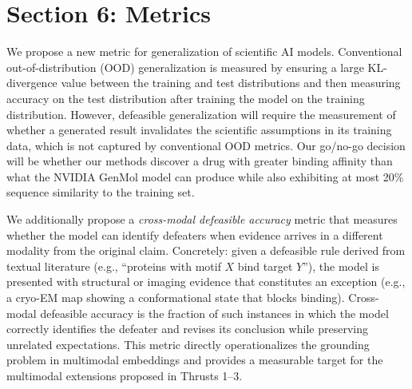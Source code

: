 \documentclass[11pt]{article}
\begin{document}
\section*{Section 6: Metrics}

We propose a new metric for generalization of scientific AI models. Conventional out-of-distribution (OOD) generalization is measured by ensuring a large KL-divergence value between the training and test distributions and then measuring accuracy on the test distribution after training the model on the training distribution. However, defeasible generalization will require the measurement of whether a generated result invalidates the scientific assumptions in its training data, which is not captured by conventional OOD metrics. Our go/no-go decision will be whether our methods discover a drug with greater binding affinity than what the NVIDIA GenMol model can produce while also exhibiting at most 20\% sequence similarity to the training set.

We additionally propose a \emph{cross-modal defeasible accuracy} metric that measures whether the model can identify defeaters when evidence arrives in a different modality from the original claim. Concretely: given a defeasible rule derived from textual literature (e.g., ``proteins with motif $X$ bind target $Y$''), the model is presented with structural or imaging evidence that constitutes an exception (e.g., a cryo-EM map showing a conformational state that blocks binding). Cross-modal defeasible accuracy is the fraction of such instances in which the model correctly identifies the defeater and revises its conclusion while preserving unrelated expectations. This metric directly operationalizes the grounding problem in multimodal embeddings and provides a measurable target for the multimodal extensions proposed in Thrusts 1--3.
\end{document}
